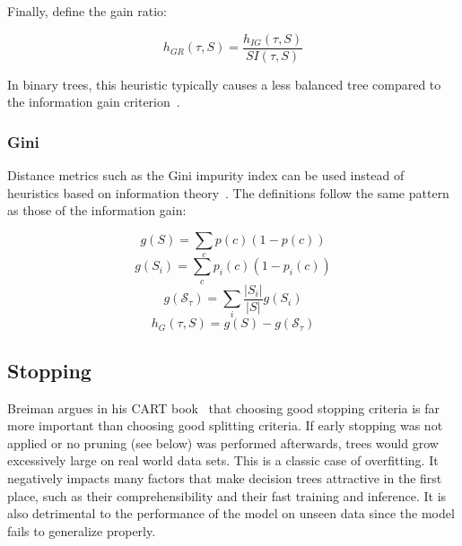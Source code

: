 Finally, define the gain ratio:

\begin{equation}
    h_{GR}(\tau, S) = \frac{h_{IG}(\tau, S)}{SI(\tau, S)}
\end{equation}

In binary trees, this heuristic typically causes a less balanced tree compared to the information gain criterion~\cite{c45}.

\subsubsection{Gini}
Distance metrics such as the Gini impurity index can be used instead of heuristics based on information theory~\cite{cart}. The definitions follow the same pattern as those of the information gain:

\begin{equation}
    g(S) = \sum_c p(c)(1 - p(c))
\end{equation}
\begin{equation}
    g(S_i) = \sum_c p_i(c)(1-p_i(c))
\end{equation}
\begin{equation}
    g(\mathcal{S}_\tau) = \sum_i \frac{|S_i|}{|S|} g(S_i)
\end{equation}
\begin{equation}
    h_G(\tau, S) = g(S) - g(\mathcal{S}_\tau)
\end{equation}


\subsection{Stopping}
Breiman argues in his CART book~\cite{cart} that choosing good stopping criteria is far more important than choosing good splitting criteria. If early stopping was not applied or no pruning (see below) was performed afterwards, trees would grow excessively large on real world data sets. This is a classic case of overfitting. It negatively impacts many factors that make decision trees attractive in the first place, such as their comprehensibility and their fast training and inference. It is also detrimental to the performance of the model on unseen data since the model fails to generalize properly.

